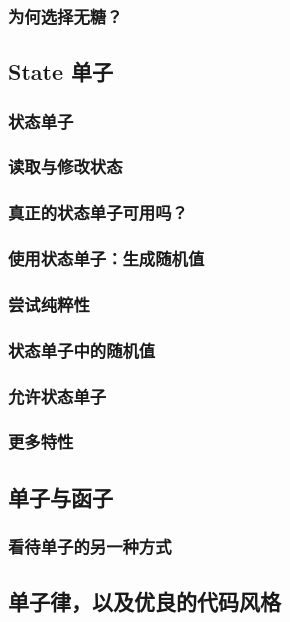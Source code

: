 \documentclass[./main.tex]{subfiles}
\begin{document}
\subsubsection*{为何选择无糖？}

\subsection*{State 单子}

\subsubsection*{状态单子}

\subsubsection*{读取与修改状态}

\subsubsection*{真正的状态单子可用吗？}

\subsubsection*{使用状态单子：生成随机值}

\subsubsection*{尝试纯粹性}

\subsubsection*{状态单子中的随机值}

\subsubsection*{允许状态单子}

\subsubsection*{更多特性}

\subsection*{单子与函子}

\subsubsection*{看待单子的另一种方式}

\subsection*{单子律，以及优良的代码风格}
\end{document}
